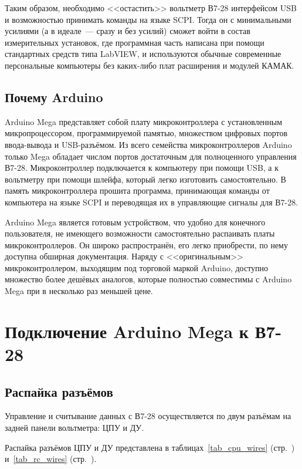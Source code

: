 \documentclass[10pt, a4paper, twocolumn]{article}
\newcommand{\SCPI}{\mbox{SCPI}}
\newcommand{\V}{\mbox{В7-28}}
\newcommand{\Arduino}{Arduino Mega}
\begin{document}
Таким образом, необходимо <<остастить>> вольтметр \V{} интерфейсом USB и возможностью принимать команды на языке \SCPI. Тогда он с минимальными усилиями (а в идеале~--- сразу и без усилий) сможет войти в состав измерительных установок, где программная часть написана при помощи стандартных средств типа LabVIEW, и используются обычные современные персональные компьютеры без каких-либо плат расширения и модулей КАМАК.

\subsection{Почему Arduino}

\Arduino{} представляет собой плату микроконтроллера с установленным микропроцессором, программируемой памятью, множеством цифровых портов ввода-вывода и USB-разъёмом. Из всего семейства микроконтроллеров Arduino только Mega обладает числом портов достаточным для полноценного управления \V. Микроконтроллер подключается к компьютеру при помощи USB, а к вольтметру при помощи шлейфа, который легко изготовить самостоятельно.  В память микроконтроллера прошита программа, принимающая команды от компьютера на языке \SCPI{} и переводящая их в управляющие сигналы для \V.

\Arduino{} является готовым устройством, что удобно для конечного пользователя, не имеющего возможности самостоятельно распаивать платы микроконтроллеров. Он широко распространён, его легко приобрести, по нему доступна обширная документация. Наряду с <<оригинальным>> микроконтроллером, выходящим под торговой маркой Arduino, доступно множество более дешёвых аналогов, которые полностью совместимы с \Arduino{} при в несколько раз меньшей цене.

\section{Подключение {\Arduino} к \V}

\subsection{Распайка разъёмов}

Управление и считывание данных с {\V} осуществляется по двум разъёмам на задней панели вольтметра: ЦПУ и ДУ.

Распайка разъёмов ЦПУ и ДУ представлена в таблицах~\ref{tab_cpu_wires} (стр.~\pageref{tab_cpu_wires}) и~\ref{tab_rc_wires} (стр.~\pageref{tab_rc_wires}).
\end{document}
